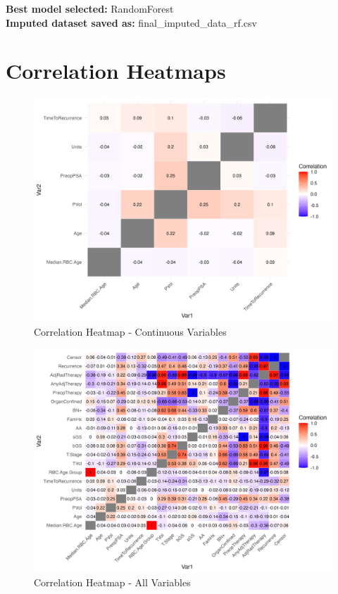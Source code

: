 \documentclass[
]{article}
\begin{document}
\textbf{Best model selected: }RandomForest\\
\textbf{Imputed dataset saved as: }final\_imputed\_data\_rf.csv

\section{Correlation Heatmaps}\label{correlation-heatmaps}

\begin{figure}[H]

{\centering \includegraphics[width=0.9\linewidth]{../example/correlation_heatmap_continuous} 

}

\caption{Correlation Heatmap - Continuous Variables}\label{fig:show-cor-cont}
\end{figure}

\begin{figure}[H]

{\centering \includegraphics[width=0.9\linewidth]{../example/correlation_heatmap_all} 

}

\caption{Correlation Heatmap - All Variables}\label{fig:show-cor-all}
\end{figure}
\end{document}
